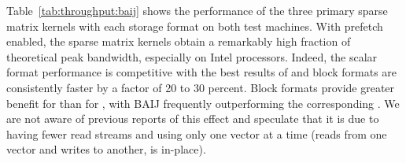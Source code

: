 Table~\ref{tab:throughput:baij} shows the performance of the three primary sparse matrix kernels with each storage format on both test machines.
With prefetch enabled, the sparse matrix kernels obtain a remarkably high fraction of theoretical peak bandwidth, especially on Intel processors.
Indeed, the scalar format performance is competitive with the best \MatMult results of \cite{williams2007osm} and block formats are consistently faster by a factor of 20 to 30 percent.
Block formats provide greater benefit for \MatSolve than for \MatMult, with BAIJ \MatSolve frequently outperforming the corresponding \MatMult.
We are not aware of previous reports of this effect and speculate that it is due to \MatSolve having fewer read streams and using only one vector at a time (\MatMult reads from one vector and writes to another, \MatSolve is in-place).

